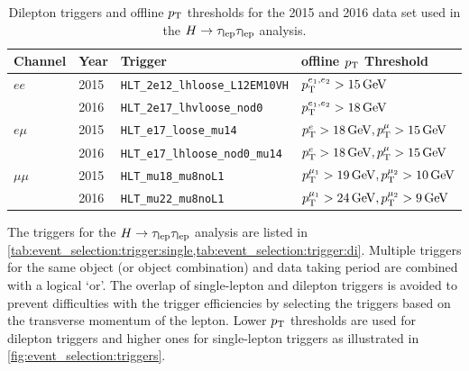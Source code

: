 \begin{table}[htpb]
    \centering
    \caption{Dilepton triggers and offline $p_\text{T}$ thresholds for the 2015 and 2016 data set used in the $H \to \tau_\text{lep} \tau_\text{lep}$ analysis.}\label{tab:event_selection:trigger:di}
    \begin{tabular}{@{}llll@{}}
        \toprule
        Channel  & Year & Trigger & offline $p_\text{T}$ Threshold \\ \midrule
        $ee$     & 2015 & \texttt{HLT\_2e12\_lhloose\_L12EM10VH} & $\pt^{e_1, e_2} > \SI{15}{\GeV}$ \\
                 & 2016 & \texttt{HLT\_2e17\_lhvloose\_nod0} & $\pt^{e_1, e_2} > \SI{18}{\GeV}$ \\ \cmidrule{1-4}
        $e\mu$   & 2015 & \texttt{HLT\_e17\_loose\_mu14} & $\pt^{e} > \SI{18}{\GeV}, \pt^\mu > \SI{15}{\GeV}$ \\
                 & 2016 & \texttt{HLT\_e17\_lhloose\_nod0\_mu14} & $\pt^{e} > \SI{18}{\GeV}, \pt^\mu > \SI{15}{\GeV}$ \\ \cmidrule{1-4}
        $\mu\mu$ & 2015 & \texttt{HLT\_mu18\_mu8noL1} & $\pt^{\mu_1} > \SI{19}{\GeV}, \pt^{\mu_2} > \SI{10}{\GeV}$ \\
                 & 2016 & \texttt{HLT\_mu22\_mu8noL1} & $\pt^{\mu_1} > \SI{24}{GeV}, \pt^{\mu_2} > \SI{9}{\GeV}$ \\
        \bottomrule
    \end{tabular}
\end{table}

The triggers for the $H \to \tau_\text{lep} \tau_\text{lep}$ analysis are listed in \cref{tab:event_selection:trigger:single,tab:event_selection:trigger:di}.
Multiple triggers for the same object (or object combination) and data taking period are combined with a logical `or'.
The overlap of single-lepton and dilepton triggers is avoided to prevent difficulties with the trigger efficiencies
by selecting the triggers based on the transverse momentum of the lepton.
Lower $p_\text{T}$ thresholds are used for dilepton triggers and higher ones for single-lepton triggers as
illustrated in \cref{fig:event_selection:triggers}.

